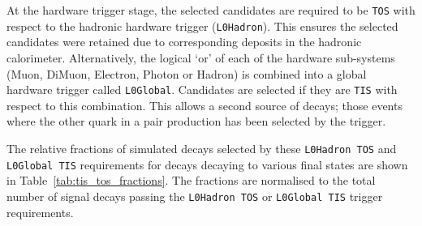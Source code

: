 At the hardware trigger stage, the selected candidates are required to be \texttt{TOS} with respect to the hadronic hardware trigger (\texttt{L0Hadron}). This ensures the selected candidates were retained due to corresponding deposits in the hadronic calorimeter. 
Alternatively, the logical `or' of each of the hardware sub-systems (Muon, DiMuon, Electron, Photon or Hadron) is combined into a global hardware trigger called \texttt{L0Global}.
Candidates are selected if they are \texttt{TIS} with respect to this combination.
This allows a second source of decays; those events where the other \bquark quark in a \bquark\bquarkbar pair production has been selected by the trigger. 



The relative fractions of simulated decays selected by these \texttt{L0Hadron TOS} and \texttt{L0Global TIS} requirements for \decay{\Bp}{\Dsp\phiz} decays decaying to various \Dsp final states are shown in Table~\ref{tab:tis_tos_fractions}. The fractions are normalised to the total number of signal decays passing the \texttt{L0Hadron TOS} or \texttt{L0Global TIS} trigger requirements. 

